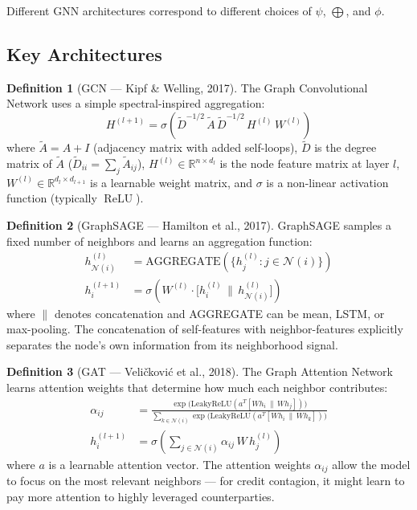 \documentclass[11pt, a4paper]{article}
\theoremstyle{definition}
\newtheorem{definition}{Definition}[section]
\theoremstyle{plain}
\theoremstyle{remark}
\newcommand{\RV}{\mathbb{R}}
\newcommand{\ReLU}{\operatorname{ReLU}}
\begin{document}
Different GNN architectures correspond to different choices of $\psi$, $\bigoplus$,
and $\phi$.

\subsection{Key Architectures}

\begin{definition}[GCN --- Kipf \& Welling, 2017]\label{def:gcn}
The Graph Convolutional Network uses a simple spectral-inspired aggregation:
\begin{equation}\label{eq:gcn-layer}
    H^{(l+1)} = \sigma\!\left(\tilde{D}^{-1/2}\, \tilde{A}\, \tilde{D}^{-1/2}\, H^{(l)}\, W^{(l)}\right)
\end{equation}
where $\tilde{A} = A + I$ (adjacency matrix with added self-loops),
$\tilde{D}$ is the degree matrix of $\tilde{A}$
($\tilde{D}_{ii} = \sum_j \tilde{A}_{ij}$),
$H^{(l)} \in \RV^{n \times d_l}$ is the node feature matrix at layer $l$,
$W^{(l)} \in \RV^{d_l \times d_{l+1}}$ is a learnable weight matrix,
and $\sigma$ is a non-linear activation function (typically $\ReLU$).
\end{definition}

\begin{definition}[GraphSAGE --- Hamilton et al., 2017]\label{def:graphsage}
GraphSAGE samples a fixed number of neighbors and learns an aggregation function:
\begin{align}
    h_{\mathcal{N}(i)}^{(l)} &= \text{AGGREGATE}\!\left(\{h_j^{(l)} : j \in \mathcal{N}(i)\}\right) \label{eq:sage-agg}\\
    h_i^{(l+1)} &= \sigma\!\left(W^{(l)} \cdot \bigl[h_i^{(l)} \,\|\, h_{\mathcal{N}(i)}^{(l)}\bigr]\right) \label{eq:sage-update}
\end{align}
where $\|$ denotes concatenation and AGGREGATE can be mean, LSTM, or max-pooling.
The concatenation of self-features with neighbor-features explicitly separates
the node's own information from its neighborhood signal.
\end{definition}

\begin{definition}[GAT --- Veli\v{c}kovi\'c et al., 2018]\label{def:gat}
The Graph Attention Network learns attention weights that determine how much
each neighbor contributes:
\begin{align}
    \alpha_{ij} &= \frac{\exp\!\bigl(\text{LeakyReLU}(a^T [W h_i \,\|\, W h_j])\bigr)}{\sum_{k \in \mathcal{N}(i)} \exp\!\bigl(\text{LeakyReLU}(a^T [W h_i \,\|\, W h_k])\bigr)} \label{eq:gat-attn}\\[4pt]
    h_i^{(l+1)} &= \sigma\!\left(\sum_{j \in \mathcal{N}(i)} \alpha_{ij}\, W\, h_j^{(l)}\right) \label{eq:gat-update}
\end{align}
where $a$ is a learnable attention vector.
The attention weights $\alpha_{ij}$ allow the model to focus on the most
relevant neighbors --- for credit contagion, it might learn to pay more attention
to highly leveraged counterparties.
\end{definition}
\end{document}
